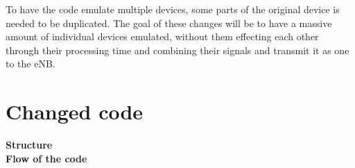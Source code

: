 To have the code emulate multiple devices, some parts of the original device is needed to be duplicated. The goal of these changes will be to have a massive amount of individual devices emulated, without them effecting each other through their processing time and combining their signals and transmit it as one to the eNB.

\section{Changed code}

\textbf{Structure}\\
\textbf{Flow of the code}\\


